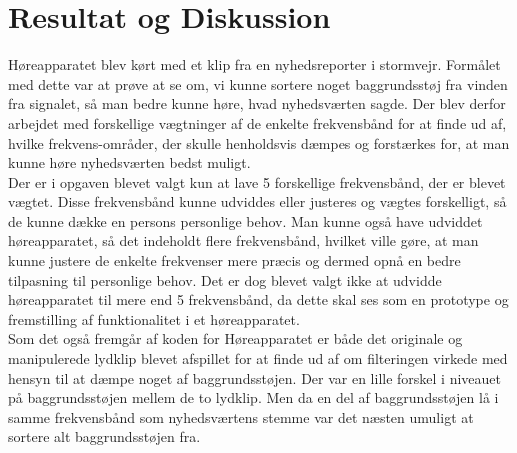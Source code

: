 \chapter{Resultat og Diskussion}\label{ch:Resultat og Diskussion}

Høreapparatet blev kørt med et klip fra en nyhedsreporter i stormvejr. Formålet med dette var at prøve at se om, vi kunne sortere noget baggrundsstøj fra vinden fra signalet, så man bedre kunne høre, hvad nyhedsværten sagde. 
Der blev derfor arbejdet med forskellige vægtninger af de enkelte frekvensbånd for at finde ud af, hvilke frekvens-områder, der skulle henholdsvis dæmpes og forstærkes for, at man kunne høre nyhedsværten bedst muligt.\\
Der er i opgaven blevet valgt kun at lave 5 forskellige frekvensbånd, der er blevet vægtet. Disse frekvensbånd kunne udviddes eller justeres og vægtes forskelligt, så de kunne dække en persons personlige behov. Man kunne også have udviddet høreapparatet, så det indeholdt flere frekvensbånd, hvilket ville gøre, at man kunne justere de enkelte frekvenser mere præcis og dermed opnå en bedre tilpasning til personlige behov. Det er dog blevet valgt ikke at udvidde høreapparatet til mere end 5 frekvensbånd, da dette skal ses som en prototype og fremstilling af funktionalitet i et høreapparatet.\\
Som det også fremgår af koden for Høreapparatet er både det originale og manipulerede lydklip blevet afspillet for at finde ud af om filteringen virkede med hensyn til at dæmpe noget af baggrundsstøjen. Der var en lille forskel i niveauet på baggrundsstøjen mellem de to lydklip. Men  da en del af baggrundsstøjen lå i samme frekvensbånd som nyhedsværtens stemme var det næsten umuligt at sortere alt baggrundsstøjen fra.